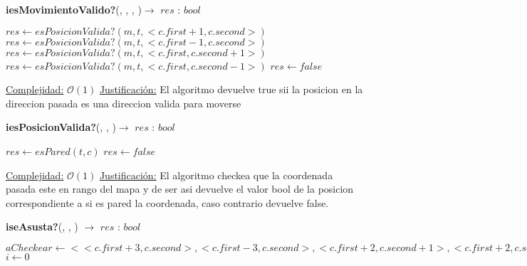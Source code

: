 \documentclass[10pt,a4paper]{article}
\begin{document}
\begin{Algoritmos}
    \begin{algorithm}{\textbf{iesMovimientoValido?}(, , , )$\to$ $res$ : $bool$}
        \begin{algorithmic}
                \State $res \gets esPosicionValida?(m, t, <c.first+1, c.second>)$
            \Else
                    \State $res \gets esPosicionValida?(m, t, <c.first-1, c.second>)$
                \Else
                        \State $res \gets esPosicionValida?(m, t, <c.first, c.second+1>)$
                    \Else
                        \State $res \gets esPosicionValida?(m, t, <c.first, c.second-1>)$
                    \Else
                        \State $res \gets false$
            \EndIf

            
            \Statex \underline{Complejidad:} $\mathcal{O}(1)$
            \Statex \underline{Justificación:} El algoritmo devuelve true sii la posicion en la direccion pasada es una direccion valida para moverse
        \end{algorithmic}
    \end{algorithm}
    
    \begin{algorithm}{\textbf{iesPosicionValida?}(, , )$\to$ $res$ : $bool$}
        \begin{algorithmic}
				\State $res \gets esPared(t, c)$
			\Else
				\State $res \gets false$	
			\EndIf
            
            \Statex \underline{Complejidad:} $\mathcal{O}(1)$
            \Statex \underline{Justificación:} El algoritmo checkea que la coordenada pasada este en rango del mapa y de ser asi devuelve el valor bool de la posicion correspondiente a si es pared la coordenada, caso contrario devuelve false.
        \end{algorithmic}
    \end{algorithm}
    
    \begin{algorithm}[H]{\textbf{iseAsusta?}(, , ) $\to$ $res$ : $bool$}	
	\begin{algorithmic}
			\State $aCheckear \gets <<c.first+3, c.second>, <c.first-3, c.second>, <c.first+2, c.second+1>, <c.first+2, c.second-1>, <c.first-2, c.second+1>, <c.first-2, c.second-1>, <c.first+1, c.second+2>, <c.first+1, c.second-2>, <c.first-1, c.second+2>, <c.first-1, c.second-2>, <c.first, c.second+3>, <c.first, c.second-3>>$
			\State $i \gets 0$
			

\end{algorithmic}
\end{algorithm}
\end{Algoritmos}
\end{document}
